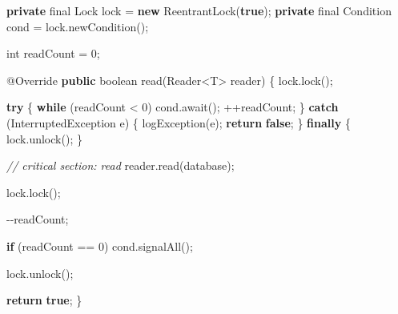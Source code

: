 \documentclass[11pt]{article}
\newenvironment{Shaded}{}{}
\newcommand{\KeywordTok}[1]{\textcolor[rgb]{0.00,0.44,0.13}{\textbf{{#1}}}}
\newcommand{\DataTypeTok}[1]{\textcolor[rgb]{0.56,0.13,0.00}{{#1}}}
\newcommand{\DecValTok}[1]{\textcolor[rgb]{0.25,0.63,0.44}{{#1}}}
\newcommand{\CommentTok}[1]{\textcolor[rgb]{0.38,0.63,0.69}{\textit{{#1}}}}
\newcommand{\FunctionTok}[1]{\textcolor[rgb]{0.02,0.16,0.49}{{#1}}}
\newcommand{\NormalTok}[1]{{#1}}
\newcommand{\ControlFlowTok}[1]{\textcolor[rgb]{0.00,0.44,0.13}{\textbf{{#1}}}}
\newcommand{\OperatorTok}[1]{\textcolor[rgb]{0.40,0.40,0.40}{{#1}}}
\newcommand{\BuiltInTok}[1]{{#1}}
\newcommand{\AttributeTok}[1]{\textcolor[rgb]{0.49,0.56,0.16}{{#1}}}
\begin{document}
\begin{Shaded}
\begin{Highlighting}[]
    \KeywordTok{private} \DataTypeTok{final} \BuiltInTok{Lock}\NormalTok{ lock }\OperatorTok{=} \KeywordTok{new} \BuiltInTok{ReentrantLock}\OperatorTok{(}\KeywordTok{true}\OperatorTok{);}
    \KeywordTok{private} \DataTypeTok{final} \BuiltInTok{Condition}\NormalTok{ cond }\OperatorTok{=}\NormalTok{ lock}\OperatorTok{.}\FunctionTok{newCondition}\OperatorTok{();}

    \DataTypeTok{int}\NormalTok{ readCount }\OperatorTok{=} \DecValTok{0}\OperatorTok{;}

    \AttributeTok{@Override}
    \KeywordTok{public} \DataTypeTok{boolean} \FunctionTok{read}\OperatorTok{(}\BuiltInTok{Reader}\OperatorTok{\textless{}}\NormalTok{T}\OperatorTok{\textgreater{}}\NormalTok{ reader}\OperatorTok{)} \OperatorTok{\{}
\NormalTok{        lock}\OperatorTok{.}\FunctionTok{lock}\OperatorTok{();}

        \ControlFlowTok{try} \OperatorTok{\{}
            \ControlFlowTok{while} \OperatorTok{(}\NormalTok{readCount }\OperatorTok{\textless{}} \DecValTok{0}\OperatorTok{)}
\NormalTok{                cond}\OperatorTok{.}\FunctionTok{await}\OperatorTok{();}
            \OperatorTok{++}\NormalTok{readCount}\OperatorTok{;}
        \OperatorTok{\}} \ControlFlowTok{catch} \OperatorTok{(}\BuiltInTok{InterruptedException}\NormalTok{ e}\OperatorTok{)} \OperatorTok{\{}
            \FunctionTok{logException}\OperatorTok{(}\NormalTok{e}\OperatorTok{);}
            \ControlFlowTok{return} \KeywordTok{false}\OperatorTok{;}
        \OperatorTok{\}} \ControlFlowTok{finally} \OperatorTok{\{}
\NormalTok{            lock}\OperatorTok{.}\FunctionTok{unlock}\OperatorTok{();}
        \OperatorTok{\}}

        \CommentTok{// critical section: read}
\NormalTok{        reader}\OperatorTok{.}\FunctionTok{read}\OperatorTok{(}\NormalTok{database}\OperatorTok{);}

\NormalTok{        lock}\OperatorTok{.}\FunctionTok{lock}\OperatorTok{();}

        \OperatorTok{{-}{-}}\NormalTok{readCount}\OperatorTok{;}

        \ControlFlowTok{if} \OperatorTok{(}\NormalTok{readCount }\OperatorTok{==} \DecValTok{0}\OperatorTok{)}
\NormalTok{            cond}\OperatorTok{.}\FunctionTok{signalAll}\OperatorTok{();}

\NormalTok{        lock}\OperatorTok{.}\FunctionTok{unlock}\OperatorTok{();}

        \ControlFlowTok{return} \KeywordTok{true}\OperatorTok{;}
    \OperatorTok{\}}


\end{Highlighting}
\end{Shaded}
\end{document}

